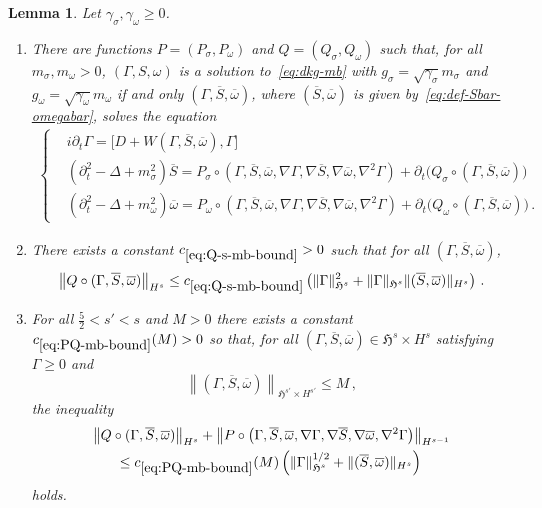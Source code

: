 \documentclass[10pt]{amsart}
\newtheorem{lemm}[theo]{Lemma}\newtheorem{prop}[theo]{Proposition}\newtheorem{coro}[theo]{Corollary}\newtheorem{conj}[theo]{Conjecture}
\theoremstyle{definition}\newtheorem{defi}[theo]{Definition}\newtheorem{rema}[theo]{Remark}\newtheorem{exam}[theo]{Example}\newtheorem{exem}[theo]{Example}\newtheorem{nota}[theo]{Notation}
\renewcommand\bar{\overline}
\newcommand{\gH}{\mathfrak{H}}
\newcommand*{\romanenumi}{\renewcommand*{\theenumi}{\roman{enumi}}}
\begin{document}
\begin{lemm}\label{lem:red-eq-mb}
Let $\gamma_\sigma, \gamma_\omega\geq 0$.
\begin{enumerate}\romanenumi
\item There are functions $P=(P_\sigma,P_\omega)$ and $Q=(Q_\sigma, Q_\omega)$ such that, for all $m_\sigma, m_\omega>0$, $(\Gamma,S,\omega)$ is a solution to~\eqref{eq:dkg-mb} with $g_\sigma=\sqrt{\gamma_\sigma}m_\sigma$ and $g_\omega=\sqrt{\gamma_\omega}m_\omega$ if and only $(\Gamma,\overline{S},\overline{\omega})$, where $(\bar{S},\bar{\omega})$ is given by~\eqref{eq:def-Sbar-omegabar}, solves the equation
\begin{align}\label{eq:D-F-PQ}
\left\{
\begin{aligned}
&i\partial_t \Gamma=\big[D + W(\Gamma, \overline{S}, \overline{\omega}),\Gamma] \\
&\left(\partial_t^2-\Delta + m_\sigma^2\right)\overline{S} = P_\sigma\circ \left(\Gamma, \overline{S}, \overline{\omega}, \nabla\Gamma, \nabla \overline{S}, \nabla \overline{\omega}, \nabla^2 \Gamma\right) + \partial_t \big(Q_\sigma\circ (\Gamma, \overline{S}, \overline{\omega})\big)\\
&\left(\partial_t^2-\Delta + m_\omega^2\right)\overline{\omega} = P_\omega\circ \left(\Gamma, \overline{S}, \overline{\omega}, \nabla\Gamma, \nabla \overline{S}, \nabla \overline{\omega},\nabla^2 \Gamma\right) + \partial_t \big(Q_\omega\circ(\Gamma, \overline{S}, \overline{\omega})\big)\,.
\end{aligned}
\right.
\end{align}
\item There exists a constant $c_{\eqref{eq:Q-s-mb-bound}}>0$ such that for all $(\Gamma,\overline{S}, \overline{\omega})$,
\begin{equation}\label{eq:Q-s-mb-bound}
\left\| Q\circ(\Gamma,\overline{S}, \overline{\omega})\right\|_{H^s} \leq c_{\eqref{eq:Q-s-mb-bound}} \left(\|\Gamma\|^2_{\gH^{s}} + \|\Gamma\|_{\gH^{s}} \|(\overline{S}, \overline{\omega})\|_{H^s}\right)\,.
\end{equation}
\item For all $\tfrac52<s'<s$ and $M>0$ there exists a constant $c_{\eqref{eq:PQ-mb-bound}}(M)>0$ so that, for all $(\Gamma,\overline{S}, \overline{\omega})\in \gH^s \times H^{s}$ satisfying $\Gamma\geq 0$ and
\begin{equation*}
\left\|(\Gamma,\overline{S}, \overline{\omega})\right\|_{\gH^{s'}\times H^{s'}} \leq M\,,
\end{equation*}
the inequality
\begin{multline}\label{eq:PQ-mb-bound}
\left\| Q \circ(\Gamma,\overline{S}, \overline{\omega})\right\|_{H^s} +\left\| P\circ\left(\Gamma, \overline{S}, \overline{\omega}, \nabla\Gamma, \nabla \overline{S}, \nabla \overline{\omega},\nabla^2 \Gamma\right)\right\|_{H^{s-1}} \\
\leq c_{\eqref{eq:PQ-mb-bound}}(M)\left(\|\Gamma\|_{\gH^s}^{1/2}+\|(\overline{S},\overline{\omega})\|_{H^{s}}\right)\,
\end{multline}
holds.
\end{enumerate}
\end{lemm}
\end{document}
